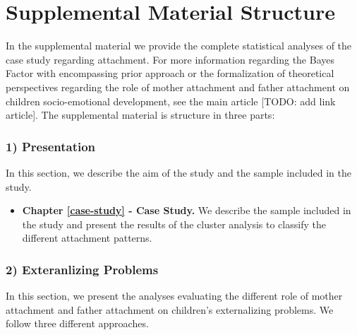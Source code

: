 \documentclass[
]{book}
\providecommand{\tightlist}{%
  \setlength{\itemsep}{0pt}\setlength{\parskip}{0pt}}
\begin{document}
\hypertarget{supplemental-material-structure}{%
\section*{Supplemental Material Structure}\label{supplemental-material-structure}}

In the supplemental material we provide the complete statistical analyses of the case study regarding attachment. For more information regarding the Bayes Factor with encompassing prior approach or the formalization of theoretical perspectives regarding the role of mother attachment and father attachment on children socio-emotional development, see the main article {[}TODO: add link article{]}. The supplemental material is structure in three parts:

\hypertarget{presentation}{%
\subsubsection*{1) Presentation}\label{presentation}}

In this section, we describe the aim of the study and the sample included in the study.

\begin{itemize}
\tightlist
\item
  \textbf{Chapter \ref{case-study} - Case Study.} We describe the sample included in the study and present the results of the cluster analysis to classify the different attachment patterns.
\end{itemize}

\hypertarget{exteranlizing-problems}{%
\subsubsection*{2) Exteranlizing Problems}\label{exteranlizing-problems}}

In this section, we present the analyses evaluating the different role of mother attachment and father attachment on children's externalizing problems. We follow three different approaches.
\end{document}
